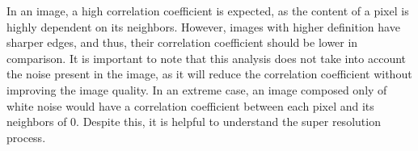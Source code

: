         In an image, a high correlation coefficient is expected, as the content of a pixel is highly dependent on its neighbors. However, images with higher definition have sharper edges, and thus, their correlation coefficient should be lower in comparison. It is important to note that this analysis does not take into account the noise present in the image, as it will reduce the correlation coefficient without improving the image quality. In an extreme case, an image composed only of white noise would have a correlation coefficient between each pixel and its neighbors of 0. Despite this, it is helpful to understand the super resolution process.
         

\clearpage

        

        
        
